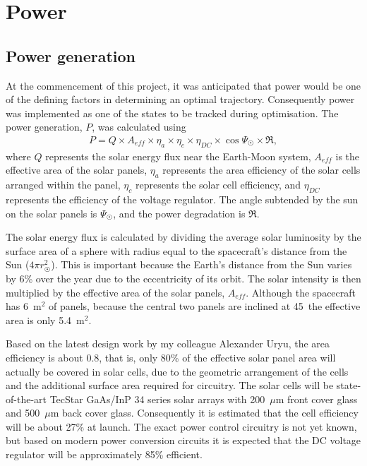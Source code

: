 
\section{Power}\label{sec:Vehicle-power}

\subsection{Power generation} \label{sub:Power-generation}

At the commencement of this project, it was anticipated that power would be one of the defining factors in determining an optimal trajectory. Consequently power was implemented as one of the states to be tracked during optimisation. The power generation, $P$, was calculated using 
\begin{gather} \label{eq:Power-generation}
P = Q\times A_{eff}\times\eta_a\times\eta_c\times\eta_{DC}\times\cos\Psi_\Sun\times\mathfrak{R},
\end{gather}
where $Q$ represents the solar energy flux near the Earth-Moon system, $A_{eff}$ is the effective area of the solar panels, $\eta_a$ represents the area efficiency of the solar cells arranged within the panel, $\eta_c$ represents the solar cell efficiency, and $\eta_{DC}$ represents the efficiency of the voltage regulator. The angle subtended by the sun on the solar panels is $\Psi_\Sun$, and the power degradation is $\mathfrak{R}$.

The solar energy flux is calculated by dividing the average solar luminosity \parencite[$3.846\times10^{26}$ W,][]{Montenbruck2000} by the surface area of a sphere with radius equal to the spacecraft's distance from the Sun ($4\pi r_\Sun^2$). This is important because the Earth's distance from the Sun varies by 6\% over the year \parencite{Montenbruck2000} due to the eccentricity of its orbit. The solar intensity is then multiplied by the effective area of the solar panels, $A_{eff}$. Although the spacecraft has 6~m$^2$ of panels, because the central two panels are inclined at 45\degrees\ the effective area is only 5.4~m$^2$.

Based on the latest design work by my colleague Alexander Uryu, the area efficiency is about 0.8, that is, only 80\% of the effective solar panel area will actually be covered in solar cells, due to the geometric arrangement of the cells and the additional surface area required for circuitry. The solar cells will be state-of-the-art TecStar GaAs/InP 34 series solar arrays with 200~$\mu$m front cover glass and 500~$\mu$m back cover glass. Consequently it is estimated that the cell efficiency will be about 27\% at launch. The exact power control circuitry is not yet known, but based on modern power conversion circuits it is expected that the DC voltage regulator will be approximately 85\% efficient. 

